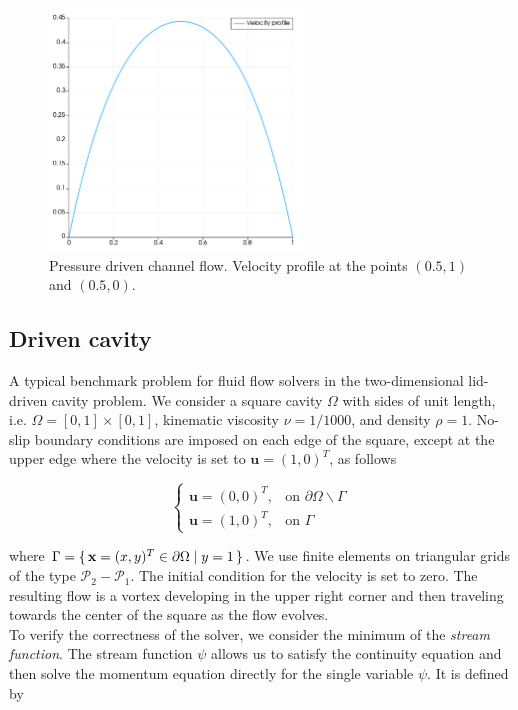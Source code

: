 \documentclass[a4paper,11pt,openright,twoside]{book}
\begin{document}
\begin{figure}[h!]
\centering
\includegraphics[width=0.6\textwidth]{images/velocity_profile.pdf}
\caption{Pressure driven channel flow. Velocity profile at the points $(0.5, 1)$ and $(0.5, 0)$.}
\end{figure}

\subsection{Driven cavity}

A typical benchmark problem for fluid flow solvers in the two-dimensional lid-driven cavity problem. We consider a square cavity $\Omega$ with sides of unit length, i.e. $\Omega = [0,1] \times [0,1]$, kinematic viscosity $\nu = 1/1000$, and density $\rho = 1$. No-slip boundary conditions are imposed on each edge of the square, except at the upper edge where the velocity is set to $\mathbf{u} = (1,0)^T$, as follows

\[
\begin{cases}
\mathbf{u} = (0, 0)^T, & \mbox{on } \partial \Omega \backslash \Gamma \\
\mathbf{u} = (1, 0)^T, & \mbox{on } \Gamma
\end{cases}
\]

where $ \Gamma = \set{ \mathbf{x} = (x,y)^T \in \partial \Omega | y = 1}$. We use finite elements on triangular grids of the type $\mathcal{P}_2-\mathcal{P}_1$. The initial condition for the velocity is set to zero. The resulting flow is a vortex developing in the upper right corner and then traveling towards the center of the square as the flow evolves. \\
To verify the correctness of the solver, we consider the minimum of the \textit{stream function}. The stream function $\psi$ allows us to satisfy the continuity equation and then solve the momentum equation directly for the single variable $\psi$. It is defined by
\end{document}
